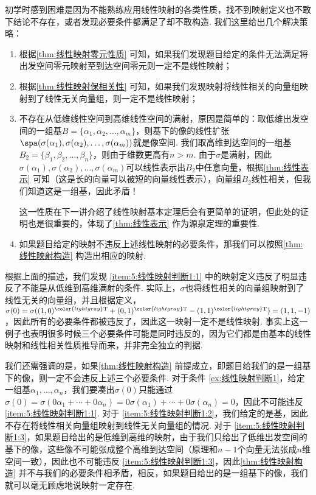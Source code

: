 初学时感到困难是因为不能熟练应用线性映射的各类性质，找不到映射定义也不敢下结论不存在，或者发现必要条件都满足了却不敢构造. 我们这里给出几个解决策略：
\begin{enumerate}
    \item \label{item:5:线性映射判断1:1}
          根据\autoref{thm:线性映射零元性质} 可知，如果我们发现题目给定的条件无法满足将出发空间零元映射至到达空间零元则一定不是线性映射；

    \item \label{item:5:线性映射判断1:2}
          根据\autoref{thm:线性映射保相关性} 可知，如果我们发现映射将线性相关的向量组映射到了线性无关向量组，则一定不是线性映射；

    \item \label{item:5:线性映射判断1:3}
          不存在从低维线性空间到高维线性空间的满射，原因是简单的：取低维出发空间的一组基$B=\{\alpha_1,\alpha_2,\ldots,\alpha_m\}$，则基下的像的线性扩张$\spa(\sigma(\alpha_1),\sigma(\alpha_2),\ldots,\sigma(\alpha_m))$就是像空间. 我们取高维到达空间的一组基$B_2=\{\beta_1,\beta_2,\ldots,\beta_n\}$，则由于维数更高有$n>m$. 由于$\sigma$是满射，因此$\sigma(\alpha_1),\sigma(\alpha_2),\ldots,\sigma(\alpha_m)$可以线性表示出$B_2$中任意向量，根据\autoref{thm:线性表示} 可知（这是长的向量可以被短的向量线性表示），向量组$B_2$线性相关，但我们知道这是一组基，因此矛盾！

          这一性质在下一讲介绍了线性映射基本定理后会有更简单的证明，但此处的证明也是很重要的，体现了\autoref{thm:线性表示} 作为源泉定理的重要性.

    \item 如果题目给定的映射不违反上述线性映射的必要条件，那我们可以按照\autoref{thm:线性映射构造} 构造出相应的映射.
\end{enumerate}

根据上面的描述，我们发现 \ref*{item:5:线性映射判断1:1} 中的映射定义违反了明显违反了不能是从低维到高维满射的条件. 实际上，$\sigma$也将线性相关的向量组映射到了线性无关的向量组，并且根据定义，$\sigma(0)=\sigma((1,0)^{\color{lightgray}\mathrm{T}}+(0,1)^{\color{lightgray}\mathrm{T}}-(1,1)^{\color{lightgray}\mathrm{T}})=(1,1,-1)$，因此所有的必要条件都被违反了，因此这一映射一定不是线性映射. 事实上这一例子也表明很多时候三个必要条件可能是同时违反的，因为它们都是由基本的线性映射和线性相关性质推导而来，并非完全独立的判据.

我们还需强调的是，如果\autoref{thm:线性映射构造} 前提成立，即题目给我们的是一组基下的像，则一定不会违反上述三个必要条件. 对于条件 \ref*{ex:线性映射判断1}，给定一组基$\alpha_1,\ldots,\alpha_n$，我们要凑出$\sigma(0)$只能通过$\sigma(0)=\sigma(0\alpha_1+\cdots+0\alpha_n)=0\sigma(\alpha_1)+\cdots+0\sigma(\alpha_n)=0$，因此不可能违反  \ref*{item:5:线性映射判断1:1}. 对于 \ref*{item:5:线性映射判断1:2}，我们给定的是基，因此不存在将线性相关向量组映射到线性无关向量组的情况. 对于 \ref*{item:5:线性映射判断1:3}，如果题目给出的是低维到高维的映射，由于我们只给出了低维出发空间的基下的像，这些像不可能张成整个高维到达空间（原理和$n-1$个向量无法张成$n$维空间一致），因此也不可能违反 \ref*{item:5:线性映射判断1:3}，因此\autoref{thm:线性映射构造} 并不与我们的必要条件相矛盾，相反，如果题目给出的是一组基下的像，我们就可以毫无顾虑地说映射一定存在.


